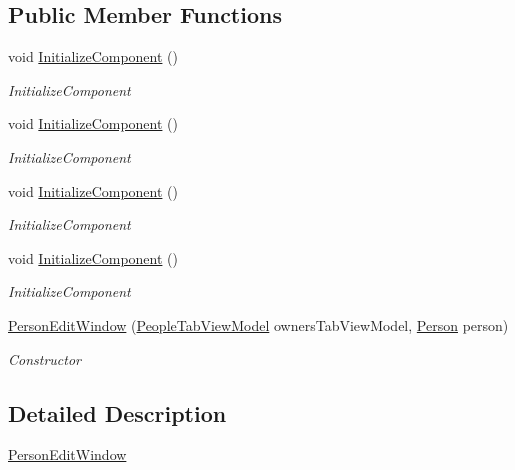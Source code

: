 \subsection*{Public Member Functions}
\begin{DoxyCompactItemize}
\item 
void \hyperlink{class_baudi_1_1_client_1_1_view_1_1_edit_windows_1_1_person_edit_window_a576fe8e688217d063a302d07ce5eb6d7}{Initialize\+Component} ()
\begin{DoxyCompactList}\small\item\em Initialize\+Component \end{DoxyCompactList}\item 
void \hyperlink{class_baudi_1_1_client_1_1_view_1_1_edit_windows_1_1_person_edit_window_a576fe8e688217d063a302d07ce5eb6d7}{Initialize\+Component} ()
\begin{DoxyCompactList}\small\item\em Initialize\+Component \end{DoxyCompactList}\item 
void \hyperlink{class_baudi_1_1_client_1_1_view_1_1_edit_windows_1_1_person_edit_window_a576fe8e688217d063a302d07ce5eb6d7}{Initialize\+Component} ()
\begin{DoxyCompactList}\small\item\em Initialize\+Component \end{DoxyCompactList}\item 
void \hyperlink{class_baudi_1_1_client_1_1_view_1_1_edit_windows_1_1_person_edit_window_a576fe8e688217d063a302d07ce5eb6d7}{Initialize\+Component} ()
\begin{DoxyCompactList}\small\item\em Initialize\+Component \end{DoxyCompactList}\item 
\hyperlink{class_baudi_1_1_client_1_1_view_1_1_edit_windows_1_1_person_edit_window_a4a00eb2a8d429219a3bf4d25c5b1d37d}{Person\+Edit\+Window} (\hyperlink{class_baudi_1_1_client_1_1_view_models_1_1_tabs_view_models_1_1_people_tab_view_model}{People\+Tab\+View\+Model} owners\+Tab\+View\+Model, \hyperlink{class_baudi_1_1_d_a_l_1_1_models_1_1_person}{Person} person)
\begin{DoxyCompactList}\small\item\em Constructor \end{DoxyCompactList}\end{DoxyCompactItemize}


\subsection{Detailed Description}
\hyperlink{class_baudi_1_1_client_1_1_view_1_1_edit_windows_1_1_person_edit_window}{Person\+Edit\+Window} 



